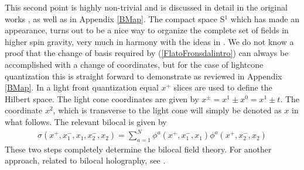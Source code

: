 \documentclass[a4paper,12pt]{article}
\def\bea{\begin{eqnarray}}
\def\eea{\end{eqnarray}}
\begin{document}
%
This second point is highly non-trivial and is discussed in detail in the original works \cite{Koch:2010cy,Koch:2014aqa}, 
as well as in Appendix \ref{BMap}. 
The compact space S$^1$ which has made an appearance, turns out to be a nice way to organize the complete set of fields 
in higher spin gravity, very much in harmony with the ideas in \cite{Das:2003vw}.
We do not know a proof that the change of basis required by (\ref{FlatoFronsdalintro}) can always be accomplished with a
change of coordinates, but for the case of lightcone quantization \cite{Koch:2010cy} this is straight forward to demonstrate
as reviewed in Appendix \ref{BMap}.
In a light front quantization equal $x^+$ slices are used to define the Hilbert space.
The light cone coordinates are given by $x^\pm=x^1\pm x^0=x^1\pm t$. 
The coordinate $x^2$, which is transverse to the light cone will simply be denoted as $x$ in what follows.
The relevant bilocal is given by
%
\bea
\sigma (x^+,x_1^-,x_1,x_2^-,x_2) =\sum_{a=1}^N\phi^a(x^+,x_1^-,x_1)\phi^a(x^+,x_2^-,x_2)
\label{xplusbilocal}
\eea
%
These two steps completely determine the bilocal field theory.
For another approach, related to bilocal holography, see \cite{Aharony:2020omh}.
\end{document}
